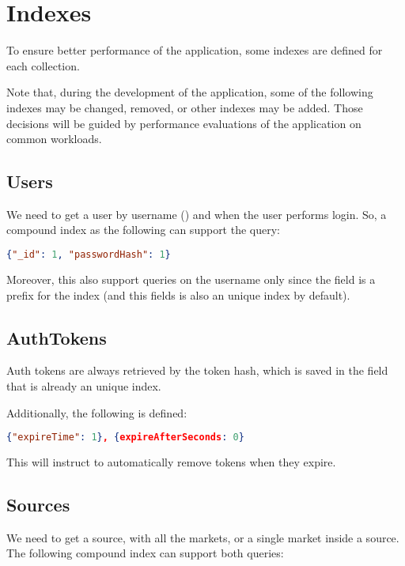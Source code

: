 \section{Indexes}\label{sec:indexes}

To ensure better performance of the application, some indexes are defined for
each collection.

Note that, during the development of the application, some of the following
indexes may be changed, removed, or other indexes may be added. Those decisions
will be guided by performance evaluations of the application on common
workloads.

\subsection{Users}

We need to get a user by username () and 
when the user performs login. So, a compound index as the following can support
the query:

\begin{lstlisting}[language=json]
{"_id": 1, "passwordHash": 1}
\end{lstlisting}

Moreover, this also support queries on the username only since the 
field is a prefix for the index (and this fields is also an unique index by
default).

\subsection{AuthTokens}

Auth tokens are always retrieved by the token hash, which is saved in the
 field that is already an unique index.

Additionally, the following  is defined:

\begin{lstlisting}[language=json]
{"expireTime": 1}, {expireAfterSeconds: 0}
\end{lstlisting}

This will instruct \mongodb{} to automatically remove tokens when they expire.

\subsection{Sources}

We need to get a source, with all the markets, or a single market inside a
source. The following compound index can support both queries:

